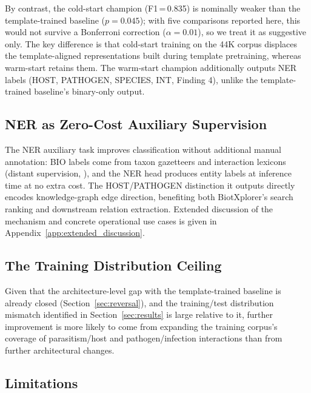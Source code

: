 \documentclass[11pt,twocolumn]{article}
\begin{document}
By contrast, the cold-start champion (F1\,=\,0.835) is nominally weaker
than the template-trained baseline ($p{=}0.045$); with five comparisons
reported here, this would not survive a Bonferroni correction
($\alpha{=}0.01$), so we treat it as suggestive only.
The key difference is that cold-start training on the 44K corpus
displaces the template-aligned representations built during template
pretraining, whereas warm-start retains them. The warm-start champion
additionally outputs NER labels (HOST, PATHOGEN, SPECIES, INT, Finding 4),
unlike the template-trained baseline's binary-only output.

\subsection{NER as Zero-Cost Auxiliary Supervision}
\label{sec:zerocost}

The NER auxiliary task improves classification without additional manual
annotation: BIO labels \citep{ramshaw1995text} come from taxon gazetteers
and interaction lexicons (distant supervision, \citealt{mintz2009distant}),
and the NER head produces entity labels at inference time at no extra
cost. The HOST/PATHOGEN distinction it outputs directly encodes
knowledge-graph edge direction, benefiting both BiotXplorer's
search ranking and downstream relation extraction. Extended discussion
of the mechanism and concrete operational use cases is given in
Appendix~\ref{app:extended_discussion}.

\subsection{The Training Distribution Ceiling}

Given that the architecture-level gap with the template-trained baseline is
already closed (Section~\ref{sec:reversal}), and the training/test
distribution mismatch identified in Section~\ref{sec:results} is large
relative to it, further improvement is more likely to come from
expanding the training corpus's coverage of parasitism/host and
pathogen/infection interactions than from further architectural changes.

\subsection{Limitations}
\label{sec:limitations}
\end{document}
